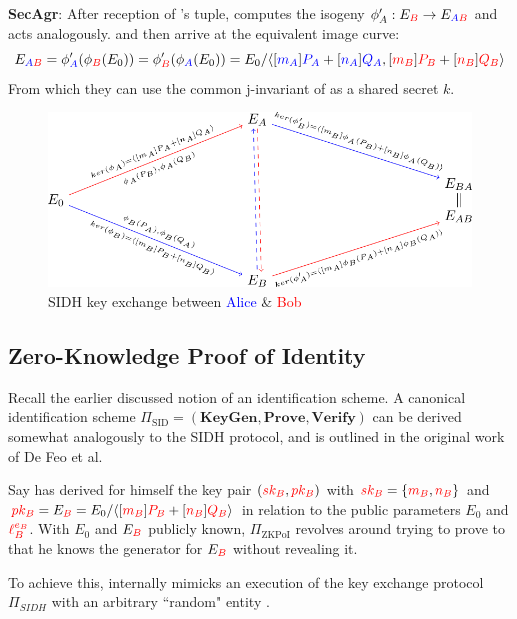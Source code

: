 \noindent
\textbf{SecAgr}: After reception of \bob's tuple, \alice computes the isogeny $\phi'_A: E_{\textcolor{red}{B}} \rightarrow E_{\textcolor{blue}{A}\textcolor{red}{B}}$ and \bob acts analogously. \alice and \bob then arrive at the equivalent image curve:
$$
E_{\textcolor{blue}{A}\textcolor{red}{B}} = \phi'_{\textcolor{blue}{A}}(\phi_{\textcolor{red}{B}}(E_0)) = \phi'_{\textcolor{red}{B}}(\phi_{\textcolor{blue}{A}}(E_0)) = E_0/ \langle [\textcolor{blue}{m_A}]\textcolor{blue}{P_A} + [\textcolor{blue}{n_A}]\textcolor{blue}{Q_A}, [\textcolor{red}{m_B}]\textcolor{red}{P_B} + [\textcolor{red}{n_B}]\textcolor{red}{Q_B} \rangle
$$
From which they can use the common j-invariant of as a shared secret $k$.

\begin{figure}[htb]
\centering
\includegraphics[scale=0.5]{keyexchange.png} %
\caption{SIDH key exchange between \textcolor{blue}{Alice} \& \textcolor{red}{Bob}}
\label{fig:kex} %
\end{figure}

\subsection{Zero-Knowledge Proof of Identity}

Recall the earlier discussed notion of an identification scheme. A canonical identification scheme $\Pi_{\text{SID}} = (\textbf{KeyGen},\textbf{Prove},\textbf{Verify})$ can be derived somewhat analogously to the SIDH protocol, and is outlined in the original work of De Feo et al.

Say \bob has derived for himself the key pair $(\textcolor{red}{sk_B},\textcolor{red}{pk_B})$ with $\textcolor{red}{sk_B} = \{\textcolor{red}{m_B},\textcolor{red}{n_B}\}$ and $\textcolor{red}{pk_B} = E_{\textcolor{red}{B}} = E_0/\langle [\textcolor{red}{m_B}]\textcolor{red}{P_B} + [\textcolor{red}{n_B}]\textcolor{red}{Q_B} \rangle$ in relation to the public parameters $E_0$ and $\textcolor{red}{\ell_{B}^{e_B}}$. With $E_0$ and $E_{\textcolor{red}{B}}$ publicly known, $\Pi_{\text{ZKPoI}}$ revolves around \bob trying to prove to \alice that he knows the generator for $E_{\textcolor{red}{B}}$ without revealing it.

To achieve this, \bob internally mimicks an execution of the key exchange protocol $\Pi_{SIDH}$ with an arbitrary ``random" entity \randall.\\

